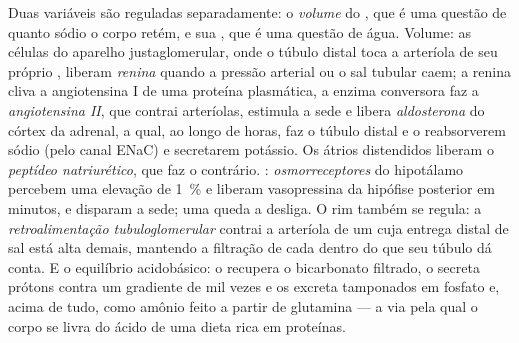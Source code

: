 \begin{definition}[Os controles]\label{def:b3:renal-osmoregulation:controls}
Duas variáveis são reguladas separadamente: o \emph{volume} do , que é uma questão de quanto sódio o corpo retém, e sua
\emph{}, que é uma questão de água. Volume: as células do
aparelho justaglomerular, onde o túbulo distal toca a arteríola de seu
próprio , liberam \emph{renina} quando a pressão arterial ou o
sal tubular caem; a renina cliva a angiotensina I de uma proteína
plasmática, a enzima conversora faz a \emph{angiotensina II}, que
contrai arteríolas, estimula a sede e libera \emph{aldosterona} do
córtex da adrenal, a qual, ao longo de horas, faz o túbulo distal e o
 reabsorverem sódio (pelo canal ENaC) e secretarem
potássio. Os átrios distendidos liberam o \emph{peptídeo natriurético},
que faz o contrário. : \emph{osmorreceptores} do hipotálamo
percebem uma elevação de \qty{1}{\%} e liberam vasopressina da hipófise
posterior em minutos, e disparam a sede; uma queda a desliga. O rim
também se regula: a \emph{retroalimentação tubuloglomerular} contrai a
arteríola de um  cuja entrega distal de sal está alta demais,
mantendo a filtração de cada  dentro do que seu túbulo dá conta. E
o equilíbrio acidobásico: o  recupera o bicarbonato
filtrado, o  secreta prótons contra um gradiente de mil
vezes e os excreta tamponados em fosfato e, acima de tudo, como amônio
feito a partir de glutamina --- a via pela qual o corpo se livra do
ácido de uma dieta rica em proteínas.
\end{definition}

